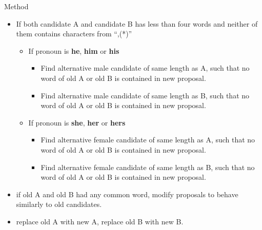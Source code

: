 \documentclass[10pt]{beamer}
\begin{document}
\begin{frame}{Method}
  \begin{itemize}
  \item If both candidate A and candidate B has less than four words and neither of them contains characters from ``,(*)''
    \begin{itemize}
    \item If pronoun is \textbf{he}, \textbf{him} or \textbf{his}
      \begin{itemize}
      \item Find alternative male candidate of same length as A, such that no word of old A or old B is contained in new proposal.
      \item Find alternative male candidate of same length as B, such that no word of old A or old B is contained in new proposal.
      \end{itemize}
    \end{itemize}
    \begin{itemize}
    \item If pronoun is \textbf{she}, \textbf{her} or \textbf{hers}
      \begin{itemize}
      \item Find alternative female candidate of same length as A, such that no word of old A or old B is contained in new proposal.
      \item Find alternative female candidate of same length as B, such that no word of old A or old B is contained in new proposal.
      \end{itemize}
    \end{itemize}
  \item if old A and old B had any common word, modify proposals to behave similarly to old candidates.
  \item replace old A with new A, replace old B with new B.
  \end{itemize}
\end{frame}
\end{document}
